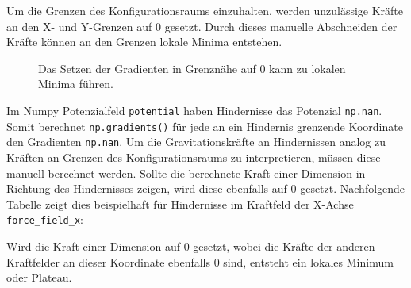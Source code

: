Um die Grenzen des Konfigurationsraums einzuhalten, werden unzulässige Kräfte an den X- und Y-Grenzen auf $0$ gesetzt. Durch dieses manuelle Abschneiden der Kräfte können an den Grenzen lokale Minima entstehen.
\begin{figure}[H]
	\centering
	\footnotesize
	\centerline{\resizebox{0.65\linewidth}{!}{}}
	\caption{Das Setzen der Gradienten in Grenznähe auf $0$ kann zu lokalen Minima führen.}
\end{figure}
Im Numpy Potenzialfeld \texttt{potential} haben Hindernisse das Potenzial \texttt{np.nan}. Somit berechnet \texttt{np.gradients()} für jede an ein Hindernis grenzende Koordinate den Gradienten \texttt{np.nan}.
Um die Gravitationskräfte an Hindernissen analog zu Kräften an Grenzen des Konfigurationsraums zu interpretieren, müssen diese manuell berechnet werden. 
Sollte die berechnete Kraft einer Dimension in Richtung des Hindernisses zeigen, wird diese ebenfalls auf $0$ gesetzt. Nachfolgende Tabelle zeigt dies beispielhaft für Hindernisse im Kraftfeld der X-Achse \texttt{force\_field\_x}:
\begin{table}[H]
\centerline{}
\end{table}
Wird die Kraft einer Dimension auf $0$ gesetzt, wobei die Kräfte der anderen Kraftfelder an dieser Koordinate ebenfalls $0$ sind, entsteht ein lokales Minimum oder Plateau.

